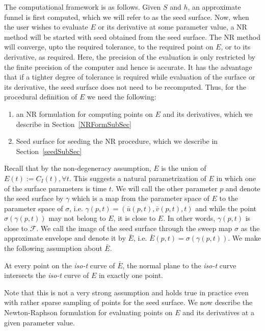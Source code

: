 \documentclass{elsart5p}
\begin{document}
The computational framework is as follows.  Given $S$ and $h$, an approximate funnel is first computed, 
which we will refer to as the seed surface.  Now, when the user wishes to evaluate $E$ or its derivative at some parameter value,  
a NR method will be started with seed obtained from the seed surface.  The NR method will converge, upto the required tolerance, to the required 
point on $E$, or to its derivative, as required.  Here, the precision of the evaluation is only restricted by the finite precision of the computer
 and hence is accurate.  It has the advantage that if a tighter degree of tolerance is required while evaluation of the surface or its derivative, the seed 
surface does not need to be recomputed.  Thus, for the procedural definition of $E$ we need the following:
\begin{enumerate}
\item an NR formulation for computing points on ${E}$ and its derivatives, which we describe in Section~\ref{NRFormSubSec}
\item Seed surface for seeding the NR procedure, which we describe in Section~\ref{seedSubSec}
\end{enumerate}

Recall that by the non-degeneracy assumption, ${E}$ is the union of $E(t) :=C_I(t), \forall t$.  This suggests a natural parametrization of ${E}$ in 
which one of the surface parameters is time $t$.  We will call the other parameter $p$ and denote the seed surface by $\gamma$ which is a map 
from the parameter space of ${E}$ to the parameter space of $\mathcal{\sigma}$, i.e. $\gamma(p,t) = (\bar{u}(p,t), \bar{v}(p,t), t)$ and while 
the point $\sigma(\gamma(p,t))$ may not belong to ${E}$, it is close to ${E}$.  In other words, $\gamma(p,t)$ is close to $\mathcal{F}$.  
We call the image of the seed surface through the sweep map $\sigma$ as the approximate envelope and denote it by $\bar{{E}}$, 
i.e. $\bar{{E}}(p,t) = \sigma(\gamma(p,t))$.  We make the following assumption about $\bar{{E}}$.
\begin{assum} \label{oneOneAssum}
At every point on the \emph{iso-t} curve of $\bar{{E}}$, the normal plane to the \emph{iso-t} curve intersects the \emph{iso-t} curve of ${E}$ in exactly one point.
\end{assum}
Note that this is not a very strong assumption and holds true in practice even with rather sparse sampling of points for the seed surface.  We now describe the Newton-Raphson formulation for evaluating points on ${E}$ and its derivatives at a given parameter value.
\end{document}
